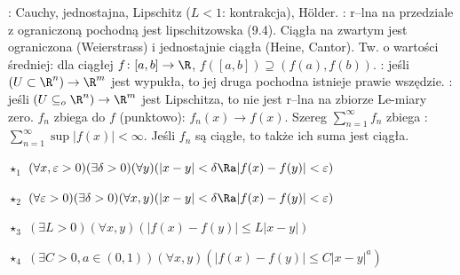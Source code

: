 : Cauchy, jednostajna, Lipschitz ($L < 1$: kontrakcja), Hölder. 
: r--lna na przedziale z ograniczoną pochodną jest lipschitzowska (9.4).
Ciągła  na zwartym jest ograniczona (Weierstrass) i jednostajnie ciągła (Heine, Cantor).
Tw. o wartości średniej: dla ciągłej $f \colon [a,b] \to \R$, $f([a,b]) \supseteq (f(a), f(b))$.
: jeśli $(U \subset \R^n) \to \R^m$ jest wypukła, to jej druga pochodna istnieje prawie wszędzie.
: jeśli $(U \subseteq_o \R^n ) \to \R^m$ jest Lipschitza, to nie jest r--lna na zbiorze Le-miary zero.
  $f_n$ zbiega do $f$ (punktowo): $f_n(x) \to f(x)$.
Szereg $\sum_{n=1}^\infty f_n$ zbiega : $\sum_{n=1}^\infty \sup |f(x)| < \infty$.
Jeśli $f_n$ są ciągłe, to także ich suma jest ciągła.

\begin{minipage}{.5\linewidth}
\vspace{1mm}
\begin{itemx}
\item[$\star_1$] $(\forall x, \varepsilon > 0) (\exists \delta > 0) (\forall y)(|x-y| < \delta \Ra |f(x) - f(y)| < \varepsilon)$ 
\item[$\star_2$] $(\forall \varepsilon>0) (\exists {\delta>0}) (\forall x, y) (|x-y| < \delta \Ra |f(x)-f(y)|<\varepsilon )$
\end{itemx}
\vspace{0.01mm}
\end{minipage}
\begin{minipage}{.5\linewidth}
\vspace{1mm}
\begin{itemx}
\item[$\star_3$] $(\exists L > 0)(\forall x, y)(|f(x) - f(y)| \le L |x-y|)$
\item[$\star_4$] $(\exists C > 0, a \in(0,1))(\forall x, y)(|f(x) - f(y)| \le C |x-y|^a)$
\end{itemx}
\vspace{0.01mm}
\end{minipage}